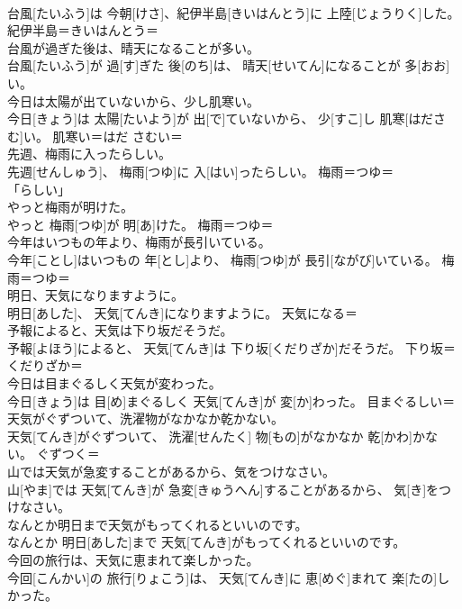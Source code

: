 \documentclass[8pt]{extreport}
\begin{document}
\begin{CJK}{UTF8}{min}
\\	台風[たいふう]は 今朝[けさ]、紀伊半島[きいはんとう]に 上陸[じょうりく]した。	紀伊半島＝きいはんとう＝ 
\\	台風が過ぎた後は、晴天になることが多い。	
\\	台風[たいふう]が 過[す]ぎた 後[のち]は、 晴天[せいてん]になることが 多[おお]い。	
\\	今日は太陽が出ていないから、少し肌寒い。	
\\	今日[きょう]は 太陽[たいよう]が 出[で]ていないから、 少[すこ]し 肌寒[はださむ]い。	肌寒い＝はだ さむい＝ 
\\	先週、梅雨に入ったらしい。	
\\	先週[せんしゅう]、 梅雨[つゆ]に 入[はい]ったらしい。	梅雨＝つゆ＝ 
\\	「らしい」
\\	やっと梅雨が明けた。	
\\	やっと 梅雨[つゆ]が 明[あ]けた。	梅雨＝つゆ＝ 
\\	今年はいつもの年より、梅雨が長引いている。	
\\	今年[ことし]はいつもの 年[とし]より、 梅雨[つゆ]が 長引[ながび]いている。	梅雨＝つゆ＝ 
\\	明日、天気になりますように。	
\\	明日[あした]、 天気[てんき]になりますように。	天気になる＝ 
\\	予報によると、天気は下り坂だそうだ。	
\\	予報[よほう]によると、 天気[てんき]は 下り坂[くだりざか]だそうだ。	下り坂＝くだりざか＝ 
\\	今日は目まぐるしく天気が変わった。	
\\	今日[きょう]は 目[め]まぐるしく 天気[てんき]が 変[か]わった。	目まぐるしい＝ 
\\	天気がぐずついて、洗濯物がなかなか乾かない。	
\\	天気[てんき]がぐずついて、 洗濯[せんたく] 物[もの]がなかなか 乾[かわ]かない。	ぐずつく＝ 
\\	山では天気が急変することがあるから、気をつけなさい。	
\\	山[やま]では 天気[てんき]が 急変[きゅうへん]することがあるから、 気[き]をつけなさい。	
\\	なんとか明日まで天気がもってくれるといいのです。	
\\	なんとか 明日[あした]まで 天気[てんき]がもってくれるといいのです。	
\\	今回の旅行は、天気に恵まれて楽しかった。	
\\	今回[こんかい]の 旅行[りょこう]は、 天気[てんき]に 恵[めぐ]まれて 楽[たの]しかった。	

\end{CJK}
\end{document}
